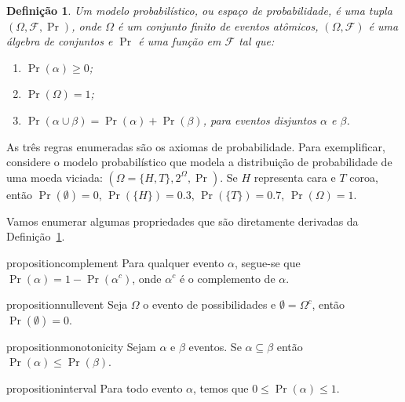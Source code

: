 \documentclass{amsart}
\theoremstyle{plain}
\newcounter{dummy-def}\numberwithin{dummy-def}{subsection}
\newtheorem{definition}[dummy-def]{Definição}
\newcounter{dummy-thm}\numberwithin{dummy-thm}{subsection}
\newcounter{dummy-prop}\numberwithin{dummy-prop}{subsection}
\newcounter{dummy-ex}\numberwithin{dummy-ex}{subsection}
\newcounter{dummy-eg}\numberwithin{dummy-eg}{subsection}
\numberwithin{equation}{subsection}
\begin{document}
\begin{definition}\label{def:prob-model}
  Um modelo probabilístico, ou espaço de probabilidade, é uma tupla $(\Omega,\mathcal{F},\Pr)$,
  onde $\Omega$ é um conjunto finito de eventos atômicos, $(\Omega,\mathcal{F})$ é uma álgebra de
  conjuntos e $\Pr$ é uma função em $\mathcal{F}$ tal que:

  \begin{enumerate}
    \item $\Pr(\alpha)\geq 0$;
    \item $\Pr(\Omega)=1$;
    \item $\Pr(\alpha\cup\beta)=\Pr(\alpha)+\Pr(\beta)$, para eventos disjuntos $\alpha$ e $\beta$.
  \end{enumerate}
\end{definition}

As três regras enumeradas são os axiomas de probabilidade. Para exemplificar, considere o modelo
probabilístico que modela a distribuição de probabilidade de uma moeda viciada: $(\Omega=\{H, T\},
2^\Omega,\Pr)$. Se $H$ representa cara e $T$ coroa, então $\Pr(\emptyset)=0$, $\Pr(\{H\})=0.3$,
$\Pr(\{T\})=0.7$, $\Pr(\Omega)=1$.

Vamos enumerar algumas propriedades que são diretamente derivadas da
Definição~\ref{def:prob-model}.

\begin{restatable}[Complemento]{proposition}{complement}\label{prop:complement}
  Para qualquer evento $\alpha$, segue-se que $\Pr(\alpha)=1-\Pr(\alpha^c)$, onde $\alpha^c$ é o
  complemento de $\alpha$.
\end{restatable}

\begin{restatable}{proposition}{nullevent}\label{prop:nullevent}
  Seja $\Omega$ o evento de possibilidades e $\emptyset=\Omega^c$, então $\Pr(\emptyset)=0$.
\end{restatable}

\begin{restatable}[Monotonicidade]{proposition}{monotonicity}\label{prop:monotonicity}
  Sejam $\alpha$ e $\beta$ eventos. Se $\alpha\subseteq\beta$ então $\Pr(\alpha)\leq\Pr(\beta)$.
\end{restatable}

\begin{restatable}{proposition}{interval}\label{prop:interval}
  Para todo evento $\alpha$, temos que $0\leq\Pr(\alpha)\leq 1$.
\end{restatable}
\end{document}
